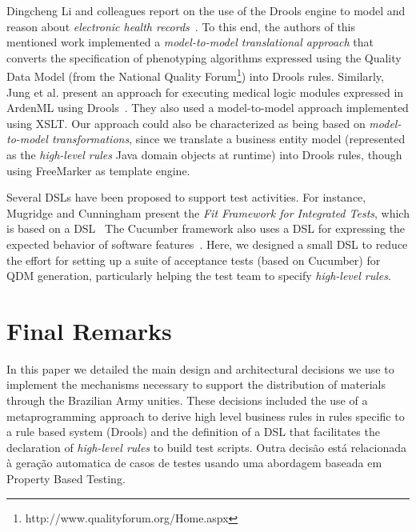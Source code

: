 \documentclass[twocolumn]{bmcart}%
\newcommand{\callers}{\emph{high-level rules}\xspace}
\begin{document}
Dingcheng Li and colleagues report on the use of the Drools engine to model and reason about \emph{electronic health records}~\cite{li2012modeling}. To this end, the authors of this mentioned work implemented a \emph{model-to-model translational approach} that converts the specification of phenotyping algorithms expressed using the Quality Data Model (from the National Quality Forum\footnote{http://www.qualityforum.org/Home.aspx}) into Drools rules. Similarly, Jung et al. present an approach for executing medical logic modules expressed in ArdenML using Drools~\cite{jung2011executing}. They also used a model-to-model approach implemented using XSLT. Our approach could also be characterized as being based on \emph{model-to-model transformations}, since we translate a business entity model (represented as the \callers Java domain objects at runtime) into Drools rules, though using FreeMarker as template engine.

Several DSLs have been proposed to support test activities. For instance, Mugridge and Cunningham present the \emph{Fit Framework for Integrated Tests}, which is based on a DSL~\cite{Mugridge:2005:FDS:1051337} The Cucumber framework also uses a DSL for expressing the expected behavior of software features~\cite{Wynne:2012:CBB:2331446}. Here, we designed a small DSL to reduce the effort for setting up a suite of acceptance tests (based on Cucumber) for QDM generation, particularly helping the test team to specify \callers. 









\section{Final Remarks}
\label{sec:conclusao}

In this paper we detailed the main design and architectural decisions we use to implement the mechanisms necessary to support the distribution of materials through the Brazilian Army unities. These decisions included the use of a metaprogramming approach to derive high level business rules in rules specific to a rule based system (Drools) and the definition of a DSL that facilitates the declaration of \callers to build test scripts. Outra decisão está relacionada à geração automatica de casos de testes usando uma abordagem baseada em Property Based Testing.
\end{document}
